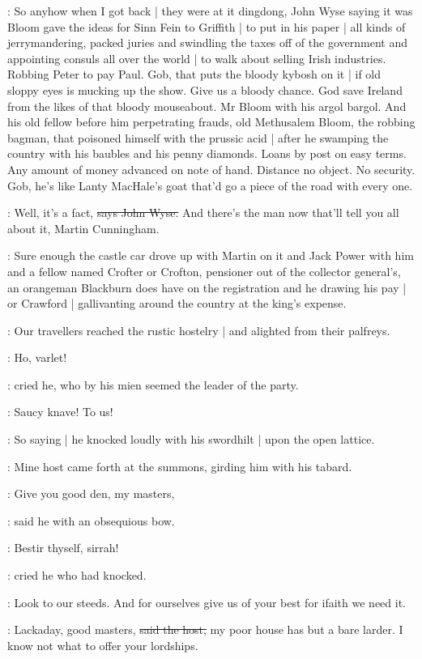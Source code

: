 \Nq:
So anyhow when I got back |
they were at it dingdong,
John Wyse
saying it was Bloom gave the ideas for Sinn Fein to Griffith |
to put in his paper |
all kinds of jerrymandering,
packed juries and swindling the taxes
off of the government and appointing consuls all over the world |
to walk about selling Irish industries.
Robbing Peter to pay Paul.
Gob,
that puts the bloody kybosh on it |
if old sloppy eyes is mucking up the show.
Give us a bloody chance.
God save Ireland from the likes of that bloody mouseabout.
Mr Bloom with his argol bargol.
And his old fellow before him
perpetrating frauds,
old Methusalem Bloom,
the robbing bagman,
that poisoned himself with the prussic acid |
after he swamping the country with his baubles and his penny diamonds.
Loans by post on easy terms.
Any amount of money advanced on note of hand.
Distance no object.
No security.
Gob,
he's like Lanty MacHale's goat that'd go a piece of the road with every one.

\johnwyse:
Well,
it's a fact,
\sout{says John Wyse.}
And there's the man now that'll tell
you all about it,
Martin Cunningham.

\Nq:
Sure enough the castle car drove up with Martin on it and Jack Power
with him and a fellow named Crofter or Crofton,
pensioner out of the collector general's,
an orangeman Blackburn does have on the registration
and he drawing his pay |
or Crawford |
gallivanting around the country at the king's expense.

:
Our travellers reached the rustic hostelry |
and alighted from their palfreys.

\cunningham:
Ho,
varlet!

:
cried he,
who by his mien seemed the leader of the party.

\cunningham:
Saucy knave!
To us!

:
So saying |
he knocked loudly with his swordhilt |
upon the open lattice.

:
Mine host came forth at the summons,
girding him with his tabard.

\terry:
Give you good den,
my masters,

:
said he with an obsequious bow.

\cunningham:
Bestir thyself,
sirrah!

:
cried he who had knocked.

\cunningham:
Look to our steeds.
And for ourselves give us of your best for ifaith we need it.

\terry:
Lackaday,
good masters,
\sout{said the host,}
my poor house has but a bare larder.
I know not what to offer your lordships.

